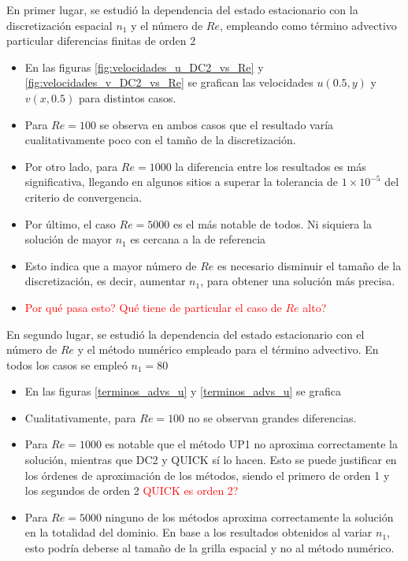 \documentclass[aps,prb,twocolumn,superscriptaddress,floatfix,longbibliography,10pt]{revtex4-2}
\newif\ifptitle
\newif\ifpnumber
\newcounter{para}
\newcommand\ptitle[1]{\par\refstepcounter{para}
{\ifpnumber{\noindent\textcolor{lightgray}{\textbf{\thepara}}\indent}\fi}
{\ifptitle{\textbf{[{#1}]}}\fi}}
\begin{document}
\ptitle{Comparación DC2 vs n1 para distintos Re}
En primer lugar, se estudió la dependencia del estado estacionario con la discretización espacial $n_1$ y el número de $Re$, empleando como término advectivo particular diferencias finitas de orden 2
\begin{itemize}
  \item En las figuras \ref{fig:velocidades_u_DC2_vs_Re} y \ref{fig:velocidades_v_DC2_vs_Re} se grafican las velocidades $u(0.5,y)$ y $v(x,0.5)$ para distintos casos.
  \item Para $Re = 100$ se observa en ambos casos que el resultado varía cualitativamente poco con el tamño de la discretización.
  \item Por otro lado, para $Re = 1000$ la diferencia entre los resultados es más significativa, llegando en algunos sitios a superar la tolerancia de $1 \times 10^{-5}$ del criterio de convergencia.
  \item Por último, el caso $Re = 5000$ es el más notable de todos. Ni siquiera la solución de mayor $n_1$ es cercana a la de referencia
  \item Esto indica que a mayor número de $Re$ es necesario disminuir el tamaño de la discretización, es decir, aumentar $n_1$, para obtener una solución más precisa.
  \item \textcolor{red}{Por qué pasa esto? Qué tiene de particular el caso de $Re$ alto?}
\end{itemize}

\ptitle{Comparación cualitativa entre métodos numéricos para distintos Re}
En segundo lugar, se estudió la dependencia del estado estacionario con el número de $Re$ y el método numérico empleado para el término advectivo. En todos los casos se empleó $n_1 = 80$

\begin{itemize}
  \item En las figuras \ref{terminos_advs_u} y \ref{terminos_advs_u} se grafica
  \item Cualitativamente, para $Re = 100$ no se observan grandes diferencias.
  \item Para $Re = 1000$ es notable que el método UP1 no aproxima correctamente la solución, mientras que DC2 y QUICK sí lo hacen. Esto se puede justificar en los órdenes de aproximación de los métodos, siendo el primero de orden 1 y los segundos de orden 2 \textcolor{red}{QUICK es orden 2?}
  \item Para $Re = 5000$ ninguno de los métodos aproxima correctamente la solución en la totalidad del dominio. En base a los resultados obtenidos al variar $n_1$, esto podría deberse al tamaño de la grilla espacial y no al método numérico.
\end{itemize}
\end{document}
